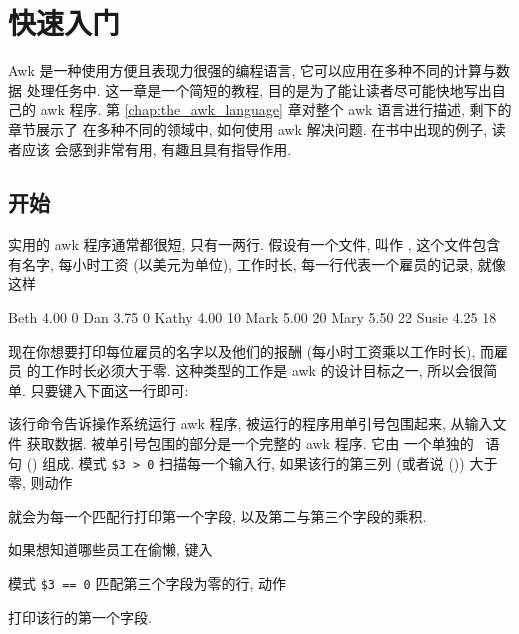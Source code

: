 
\chapter{快速入门}
\label{chap:an_awk_tutorial}

Awk 是一种使用方便且表现力很强的编程语言, 它可以应用在多种不同的计算与数据
处理任务中. 这一章是一个简短的教程, 目的是为了能让读者尽可能快地写出自己的
awk 程序.
第 \ref{chap:the_awk_language} 章对整个 awk 语言进行描述, 剩下的章节展示了
在多种不同的领域中, 如何使用 awk 解决问题. 在书中出现的例子, 读者应该
会感到非常有用, 有趣且具有指导作用.

\section{开始}
\label{sec:getting_started}

实用的 awk 程序通常都很短, 只有一两行. 假设有一个文件, 叫作
, 这个文件包含有名字, 每小时工资 (以美元为单位),
工作时长, 每一行代表一个雇员的记录, 就像这样
\begin{awkcode}
    Beth    4.00    0
    Dan     3.75    0
    Kathy   4.00    10
    Mark    5.00    20
    Mary    5.50    22
    Susie   4.25    18
\end{awkcode}
现在你想要打印每位雇员的名字以及他们的报酬 (每小时工资乘以工作时长), 而雇员
的工作时长必须大于零. 这种类型的工作是 awk 的设计目标之一, 所以会很简单.
只要键入下面这一行即可:
该行命令告诉操作系统运行 awk 程序, 被运行的程序用单引号包围起来, 从输入文件
 获取数据. 被单引号包围的部分是一个完整的 awk 程序. 它由
一个单独的 \ 语句
() 组成.
模式 \verb'$3 > 0' 扫描每一个输入行, 如果该行的第三列 (或者说 
()) 大于零, 则动作
就会为每一个匹配行打印第一个字段, 以及第二与第三个字段的乘积.

如果想知道哪些员工在偷懒, 键入
模式 \verb'$3 == 0' 匹配第三个字段为零的行, 动作
打印该行的第一个字段.


